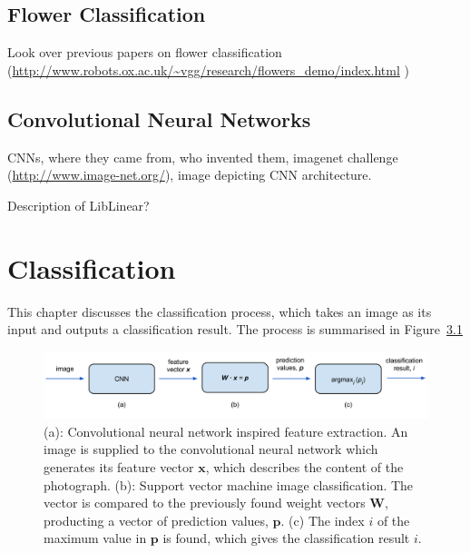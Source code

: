 \documentclass[11pt, a4paper]{report}
\newcommand{\vect}[1]{\boldsymbol{#1}}
\begin{document}
\section{Flower Classification}

Look over previous papers on flower classification (\url{http://www.robots.ox.ac.uk/~vgg/research/flowers_demo/index.html}	)

\section{Convolutional Neural Networks}

CNNs, where they came from, who invented them, imagenet challenge (\url{http://www.image-net.org/}), image depicting CNN architecture. 


Description of LibLinear?












\chapter{Classification}

This chapter discusses the classification process, which takes an image as its input and outputs a classification result. The process is summarised in Figure~\ref{img:08}

\begin{figure}[hbt]
	\centering
  \includegraphics[totalheight=3cm]{img/08.png}
  \caption{(a): Convolutional neural network inspired feature extraction. An image is supplied to the convolutional neural network which generates its feature vector $\vect{x}$, which describes the content of the photograph. (b): Support vector machine image classification. The vector is compared to the previously found weight vectors $\vect{W}$, producting a vector of prediction values, $\vect{p}$. (c) The index $i$ of the maximum value in $\vect{p}$ is found, which gives the classification result $i$.}
  \label{img:08}
\end{figure}
\end{document}
